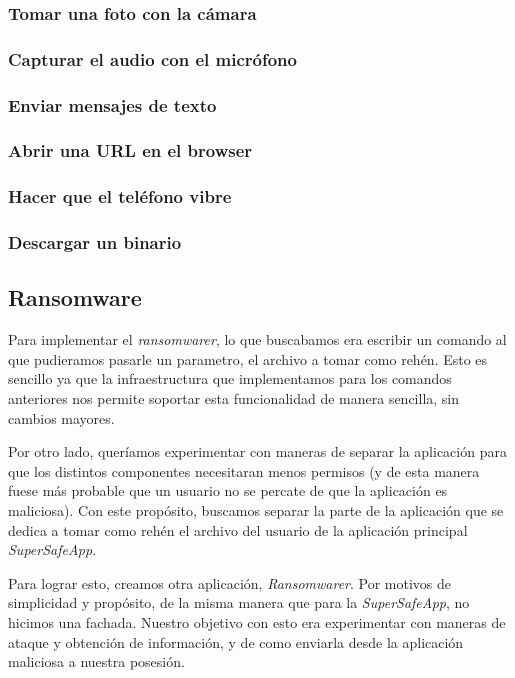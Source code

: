 \subsubsection{Tomar una foto con la cámara}
\subsubsection{Capturar el audio con el micrófono}
\subsubsection{Enviar mensajes de texto}
\subsubsection{Abrir una URL en el browser}
\subsubsection{Hacer que el teléfono vibre}
\subsubsection{Descargar un binario}



\subsection{Ransomware}

Para implementar el \textit{ransomwarer}, lo que buscabamos era escribir un comando al que pudieramos pasarle un parametro, el archivo
a tomar como rehén. Esto es sencillo ya que la infraestructura que implementamos para los comandos anteriores nos permite soportar esta
funcionalidad de manera sencilla, sin cambios mayores.

Por otro lado, queríamos experimentar con maneras de separar la aplicación para que los distintos componentes necesitaran menos permisos
(y de esta manera fuese más probable que un usuario no se percate de que la aplicación es maliciosa). Con este propósito, buscamos separar
la parte de la aplicación que se dedica a tomar como rehén el archivo del usuario de la aplicación principal \textit{SuperSafeApp}.

Para lograr esto, creamos otra aplicación, \textit{Ransomwarer}. Por motivos de simplicidad y propósito, de la misma manera que para
la \textit{SuperSafeApp}, no hicimos una fachada. Nuestro objetivo con esto era experimentar con maneras de ataque y obtención de 
información, y de como enviarla desde la aplicación maliciosa a nuestra posesión.

